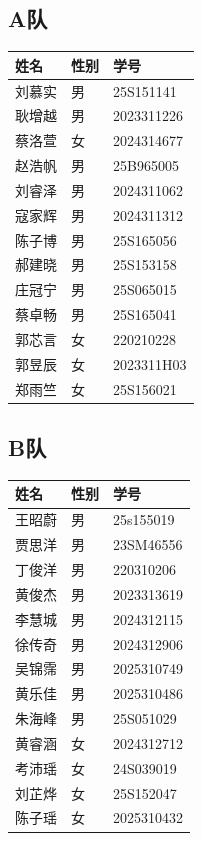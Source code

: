 \documentclass{ctexart}
\begin{document}
\subsection*{A队}
\renewcommand{\arraystretch}{1.2}
\begin{tabularx}{\textwidth}{@{} L{3.2cm} M{2cm} X @{}}
    \toprule
    \textbf{姓名} & \textbf{性别} & \textbf{学号} \\
    \midrule
    刘慕实 & 男 & 25S151141 \\
    耿增越 & 男 & 2023311226 \\
    蔡洛萱 & 女 & 2024314677 \\
    赵浩帆 & 男 & 25B965005 \\
    刘睿泽 & 男 & 2024311062 \\
    寇家辉 & 男 & 2024311312 \\
    陈子博 & 男 & 25S165056 \\
    郝建晓 & 男 & 25S153158 \\
    庄冠宁 & 男 & 25S065015 \\
    蔡卓畅 & 男 & 25S165041 \\
    郭芯言 & 女 & 220210228 \\
    郭昱辰 & 女 & 2023311H03 \\
    郑雨竺 & 女 & 25S156021 \\
    \bottomrule
\end{tabularx}

\subsection*{B队}
\renewcommand{\arraystretch}{1.2}
\begin{tabularx}{\textwidth}{@{} L{3.2cm} M{2cm} X @{}}
    \toprule
    \textbf{姓名} & \textbf{性别} & \textbf{学号} \\
    \midrule
    王昭蔚 & 男 & 25s155019 \\
    贾思洋 & 男 & 23SM46556 \\
    丁俊洋 & 男 & 220310206 \\
    黄俊杰 & 男 & 2023313619 \\
    李慧城 & 男 & 2024312115 \\
    徐传奇 & 男 & 2024312906 \\
    吴锦霈 & 男 & 2025310749 \\
    黄乐佳 & 男 & 2025310486 \\
    朱海峰 & 男 & 25S051029 \\
    黄睿涵 & 女 & 2024312712 \\
    考沛瑶 & 女 & 24S039019 \\
    刘芷烨 & 女 & 25S152047 \\
    陈子瑶 & 女 & 2025310432 \\
    \bottomrule
\end{tabularx}
\end{document}
